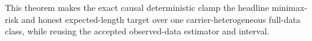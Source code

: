 This theorem makes the exact causal deterministic clamp the headline minimax-risk and honest expected-length target over one carrier-heterogeneous full-data class, while reusing the accepted observed-data estimator and interval.